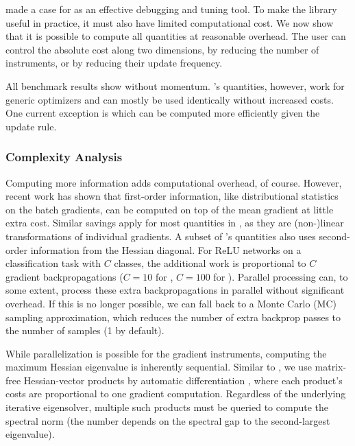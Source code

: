  made a case for \cockpit as an effective debugging and
tuning tool. To make the library useful in practice, it must also have limited
computational cost. We now show that it is possible to compute all quantities at
reasonable overhead. The user can control the absolute cost along two
dimensions, by reducing the number of instruments, or by reducing their update
frequency.

All benchmark results show \sgd without momentum. \cockpit's quantities,
however, work for generic optimizers and can mostly be used identically without
increased costs. One current exception is  which can be
computed more efficiently given the update rule.

\subsubsection{Complexity Analysis}

Computing more information adds computational overhead, of course. However,
recent work \citep{dangel2020backpack} has shown that first-order information,
like distributional statistics on the batch gradients, can be computed on top of
the mean gradient at little extra cost. Similar savings apply for most
quantities in , as they are
\mbox{(non-)linear} transformations of individual gradients. A subset of
\cockpit's quantities also uses second-order information from the Hessian
diagonal. For ReLU networks on a classification task with $C$ classes, the
additional work is proportional to $C$ gradient backpropagations (\ie $C=10$ for
\cifarten, $C=100$ for \cifarhun). Parallel processing can, to some extent,
process these extra backpropagations in parallel without significant overhead.
If this is no longer possible, we can fall back to a Monte Carlo (MC) sampling
approximation, which reduces the number of extra backprop passes to the number
of samples (1 by default).

While parallelization is possible for the gradient instruments, computing the
maximum Hessian eigenvalue is inherently sequential. Similar to
\citet{yao2020pyhessian}, we use matrix-free Hessian-vector products by
automatic differentiation \citep{pearlmutter1994fast}, where each product's
costs are proportional to one gradient computation. Regardless of the underlying
iterative eigensolver, multiple such products must be queried to compute the
spectral norm (the number depends on the spectral gap to the second-largest
eigenvalue).

